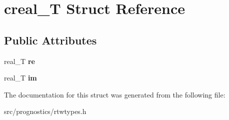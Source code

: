 \hypertarget{structcreal__T}{}\section{creal\+\_\+T Struct Reference}
\label{structcreal__T}
\subsection*{Public Attributes}
\begin{DoxyCompactItemize}
\item 
\mbox{\label{structcreal__T_aa01fd35e28518224e8641cce5b66e413}} 
real\+\_\+T {\bfseries re}
\item 
\mbox{\label{structcreal__T_ae412537b1f468c79a4ecfa191e35650d}} 
real\+\_\+T {\bfseries im}
\end{DoxyCompactItemize}


The documentation for this struct was generated from the following file\+:\begin{DoxyCompactItemize}
\item 
src/prognostics/rtwtypes.\+h\end{DoxyCompactItemize}
